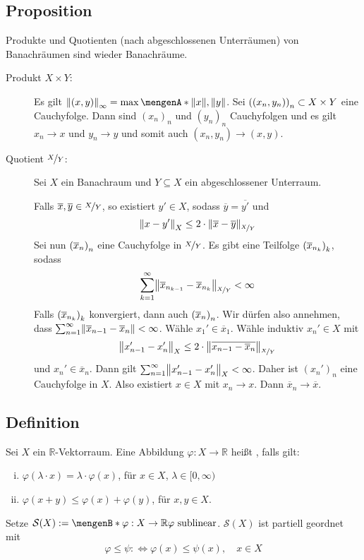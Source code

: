 \subsection[Proposition: Produkte und Quotienten von Banachräumen]{Proposition} %
\label{sub:216}
Produkte und Quotienten (nach abgeschlossenen Unterräumen) von Banachräumen sind wieder Banachräume.
\begin{description}
	\item[Produkt $X \times Y$:] Es gilt $\norm[\infty]{(x,y)} = \max \set{\norm{x}, \norm{y}}$. Sei $\enbrace*{(x_n, y_n)}_n \subset X \times Y$ eine Cauchyfolge.
	Dann sind $(x_n)_n$ und $(y_n)_n$ Cauchyfolgen und es gilt $x_n \to x$ und $y_n \to y$ und somit auch $(x_n, y_n) \to (x,y)$.
	\item[Quotient $\nicefrac{X}{Y}$:] Sei $X$ ein Banachraum und $Y \subseteq X$ ein abgeschlossener Unterraum. 
	
	Falls $\overline{x}, \overline{y} \in \nicefrac{X}{Y}$, so existiert $y' \in X$, sodass $\overline{y} = \overline{y'}$ und 
	\[
		\norm[X]{x-y'} \le 2 \cdot \norm[\nicefrac{X}{Y}]{\overline{x} - \overline{y}}  
	\] 
	Sei nun $\enbrace*{\overline{x}_n }_n$ eine Cauchyfolge in $\nicefrac{X}{Y}$. Es gibt eine Teilfolge $\enbrace*{\overline{x}_{n_k}}_k$, sodass
	\[
		\sum_{k=1}^{\infty} \norm[\nicefrac{X}{Y}]{\overline{x}_{n_{k-1}} - \overline{x}_{n_k}} < \infty 
	\]
	Falls $\enbrace*{\overline{x}_{n_k} }_k $ konvergiert, dann auch $\enbrace*{\overline{x}_n}_n$. Wir dürfen also \oE annehmen, dass $\sum_{n=1}^{\infty} \norm{\overline{x}_{n-1} - \overline{x}_n }< \infty$. Wähle $x_1' \in \overline{x}_1$. Wähle induktiv $x_n' \in X$  mit
	\[
		\norm[X]{x_{n-1}' - x_n'} \le 2 \cdot \norm[\nicefrac{X}{Y}]{\overline{x_{n-1} - \overline{x}_n } }  
	\]
	und $x_n' \in \overline{x}_n$. Dann gilt $\sum_{n=1}^{\infty} \norm[X]{x_{n-1}' - x_n'} < \infty $. Daher ist $(x_n')_n$ eine Cauchyfolge in $X$. Also existiert 
	$x \in X$ mit $x_n \to x$. Dann $\overline{x}_n  \to \overline{x}$. \bewende
\end{description}

\subsection[Definition: Sublineare Abbildung]{Definition} %
\label{sub:217}
Sei $X$ ein $\mathds{R}$-Vektorraum. Eine Abbildung $\varphi : X \to \mathds{R}$ heißt , falls gilt:
\begin{enumerate}[(i)]
	\item $\varphi(\lambda \cdot x) = \lambda \cdot \varphi(x)$, für $x \in X$, $\lambda \in [0,\infty)$
	\item $\varphi(x+y) \le \varphi(x) + \varphi(y)$, für $x,y \in X$.
\end{enumerate}
Setze $\mathcal{S}(X) := \set[\varphi : X \to \mathds{R}]{\varphi \text{ sublinear}}$. $\mathcal{S}(X)$ ist partiell geordnet mit 
\[
	\varphi \le \psi :\iff \varphi(x) \le \psi(x) ,\quad  x \in X
\]

